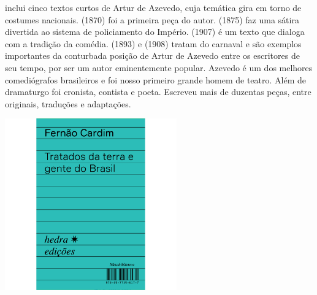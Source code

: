 \hspace*{-7cm}\hrulefill\hspace*{-7cm}

\medskip

 inclui cinco textos curtos de Artur de Azevedo, cuja temática gira em torno de costumes nacionais. {} (1870) foi a primeira peça do autor. {} (1875) faz uma sátira divertida ao sistema de policiamento do Império. {} (1907) é um texto que dialoga com a tradição da comédia. {} (1893) e {} (1908) tratam do carnaval e são exemplos importantes da conturbada posição de Artur de Azevedo entre os escritores de seu tempo, por ser um autor eminentemente popular. Azevedo é um dos melhores comediógrafos brasileiros e foi nosso primeiro grande homem de teatro. Além de dramaturgo foi cronista, contista e poeta. Escreveu mais de duzentas peças, entre originais, traduções e adaptações.


\vfill

\hspace*{-.4cm}\begin{minipage}[c]{.5\linewidth}
\small{
{}}
\end{minipage}

\pagebreak

\begin{center}
\hspace*{-3.6cm}
\hspace*{3.1cm}\includegraphics[width=74mm]{./grid/cardim.jpg}
\end{center}

